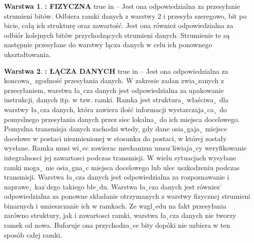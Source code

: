 \documentclass[a4paper,11pt]{article}
\theoremstyle{definition}
\newtheorem{tw}{Warstwa}
\begin{document}
\begin{tw}\textbf{: FIZYCZNA}
 true in 
 -- Jest ona odpowiedzialna za przesyłanie strumieni bitów. Odbiera ramki danych z warstwy 2 i przesyła szeregowo, bit po bicie, całą ich strukturę oraz zawartość. Jest ona również odpowiedzialna za odbiór kolejnych bitów przychodzących strumieni danych. Strumienie te są następnie przesyłane do warstwy łącza danych w celu ich ponownego ukształtowania.
\end{tw}
\begin{tw}\textbf{: ŁĄCZA DANYCH}
	 true in 
	-- Jest ona odpowiedzialna za koncowa˛ zgodność przesyłania
	danych. W zakresie zadan zwia˛zanych z przesyłaniem, warstwa ła˛cza danych jest odpowiedzialna
	za upakowanie instrukcji, danych itp. w tzw. ramki. Ramka jest struktura˛ właściwa˛ dla warstwy ła˛cza danych, która zawiera ilość informacji wystarczaja˛ca˛ do pomyslnego
	przesyłania danych przez siec lokalna˛ do ich miejsca docelowego. Pomyslna transmisja
	danych zachodzi wtedy, gdy dane osia˛gaja˛ miejsce docelowe w postaci niezmienionej
	w stosunku do postaci, w której zostały wysłane. Ramka musi wi˛ec zawierac mechanizm
	umoz˙liwiaja˛cy weryfikowanie integralnosci jej zawartosci podczas transmisji. W wielu sytuacjach
	wysyłane ramki moga˛ nie osia˛gna˛c miejsca docelowego lub ulec uszkodzeniu podczas
	transmisji. Warstwa ła˛cza danych jest odpowiedzialna za rozpoznawanie i naprawe˛
	kaz˙dego takiego błe˛du. Warstwa ła˛cza danych jest równiez˙ odpowiedzialna za ponowne
	składanie otrzymanych z warstwy fizycznej strumieni binarnych i umieszczanie ich w ramkach.
	Ze wzgl˛edu na fakt przesyłania zarówno struktury, jak i zawartosci ramki, warstwa
	ła˛cza danych nie tworzy ramek od nowa. Buforuje ona przychodza˛ce bity dopóki nie uzbiera
	w ten sposób całej ramki.
\end{tw}
\end{document}

